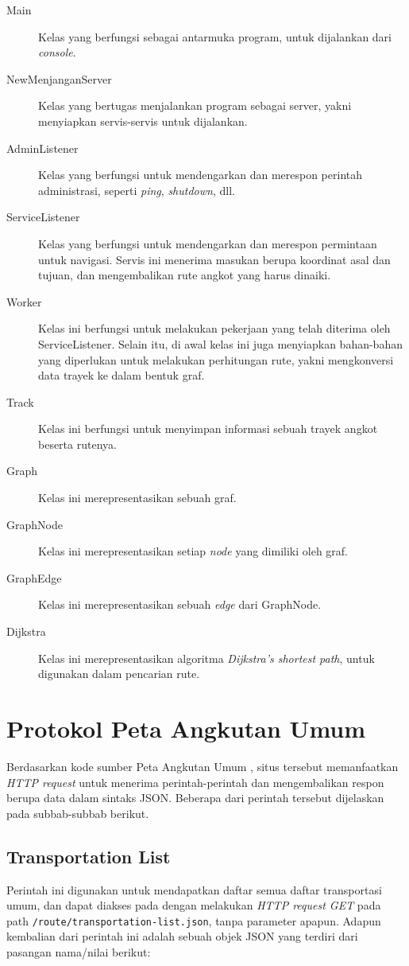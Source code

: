 \begin{description}
	\item[Main] Kelas yang berfungsi sebagai antarmuka program, untuk dijalankan dari \textit{console}.
	\item[NewMenjanganServer] Kelas yang bertugas menjalankan program sebagai server, yakni menyiapkan servis-servis untuk dijalankan.
	\item[AdminListener] Kelas yang berfungsi untuk mendengarkan dan merespon perintah administrasi, seperti \textit{ping}, \textit{shutdown}, dll.
	\item[ServiceListener] Kelas yang berfungsi untuk mendengarkan dan merespon permintaan untuk navigasi. Servis ini menerima masukan berupa koordinat asal dan tujuan, dan mengembalikan rute angkot yang harus dinaiki.
	\item[Worker] Kelas ini berfungsi untuk melakukan pekerjaan yang telah diterima oleh ServiceListener. Selain itu, di awal kelas ini juga menyiapkan bahan-bahan yang diperlukan untuk melakukan perhitungan rute, yakni mengkonversi data trayek ke dalam bentuk graf.
	\item[Track] Kelas ini berfungsi untuk menyimpan informasi sebuah trayek angkot beserta rutenya.
	\item[Graph] Kelas ini merepresentasikan sebuah graf.
	\item[GraphNode] Kelas ini merepresentasikan setiap \textit{node} yang dimiliki oleh graf.
	\item[GraphEdge] Kelas ini merepresentasikan sebuah \textit{edge} dari GraphNode.
	\item[Dijkstra] Kelas ini merepresentasikan algoritma \textit{Dijkstra's shortest path}\cite{Cormen:2001}, untuk digunakan dalam pencarian rute.
\end{description}

\section{Protokol Peta Angkutan Umum}

Berdasarkan kode sumber Peta Angkutan Umum \cite{angkotwebid}, situs tersebut memanfaatkan \textit{HTTP request} \cite{rfc7231} untuk menerima perintah-perintah dan mengembalikan respon berupa data dalam sintaks JSON. Beberapa dari perintah tersebut dijelaskan pada subbab-subbab berikut.

\subsection{Transportation List}
Perintah ini digunakan untuk mendapatkan daftar semua daftar transportasi umum, dan dapat diakses pada dengan melakukan \textit{HTTP request GET} pada path \texttt{/route/transportation-list.json}, tanpa parameter apapun. Adapun kembalian dari perintah ini adalah sebuah objek JSON yang terdiri dari pasangan nama/nilai berikut:

